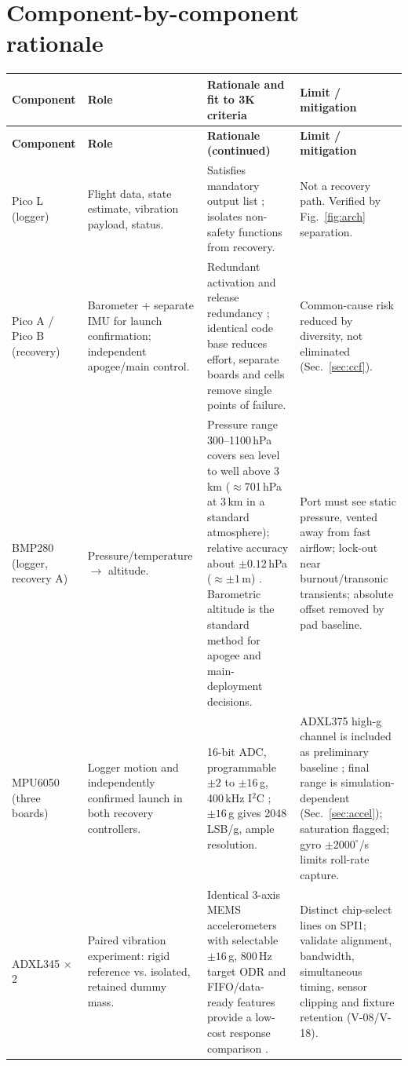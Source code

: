 \section{Component-by-component rationale}\label{sec:components}
\small
\begingroup
{}
\begin{longtable}{@{}L{23mm}L{30mm}L{60mm}L{37mm}@{}}
\toprule{}\textbf{Component}&\textbf{Role}&\textbf{Rationale and fit to 3K criteria}&\textbf{Limit / mitigation}\\\midrule\endfirsthead
\toprule{}\textbf{Component}&\textbf{Role}&\textbf{Rationale (continued)}&\textbf{Limit / mitigation}\\\midrule\endhead
\bottomrule\endlastfoot
Pico L (logger) & Flight data, state estimate, vibration payload, status. & Satisfies mandatory output list \cite{rtc2027app03}; isolates non-safety functions from recovery. & Not a recovery path. Verified by Fig.~\ref{fig:arch} separation.\\
Pico A / Pico B (recovery) & Barometer + separate IMU for launch confirmation; independent apogee/main control. & Redundant activation and release redundancy \cite{rtc2027app03}; identical code base reduces effort, separate boards and cells remove single points of failure. & Common-cause risk reduced by diversity, not eliminated (Sec.~\ref{sec:ccf}).\\
BMP280 (logger, recovery A) & Pressure/temperature $\rightarrow$ altitude. & Pressure range 300--1100\,hPa covers sea level to well above 3\,km ($\approx$701\,hPa at 3\,km in a standard atmosphere); relative accuracy about $\pm0.12$\,hPa ($\approx\pm1$\,m) \cite{bmp280ds}. Barometric altitude is the standard method for apogee and main-deployment decisions. & Port must see static pressure, vented away from fast airflow; lock-out near burnout/transonic transients; absolute offset removed by pad baseline.\\
MPU6050 (three boards) & Logger motion and independently confirmed launch in both recovery controllers. & 16-bit ADC, programmable $\pm2$ to $\pm16$\,g, 400\,kHz I$^2$C \cite{mpu6050ds,i2cspec}; $\pm16$\,g gives 2048\,LSB/g, ample resolution. & ADXL375 high-g channel is included as preliminary baseline \cite{adxl375ds}; final range is simulation-dependent (Sec.~\ref{sec:accel}); saturation flagged; gyro $\pm2000^{\circ}$/s limits roll-rate capture.\\
ADXL345 $\times$2 & Paired vibration experiment: rigid reference vs. isolated, retained dummy mass. & Identical 3-axis MEMS accelerometers with selectable $\pm16$\,g, 800\,Hz target ODR and FIFO/data-ready features provide a low-cost response comparison \cite{adxl345ds,tudsat2024frodo}. & Distinct chip-select lines on SPI1; validate alignment, bandwidth, simultaneous timing, sensor clipping and fixture retention (V-08/V-18).\\

\end{longtable}
